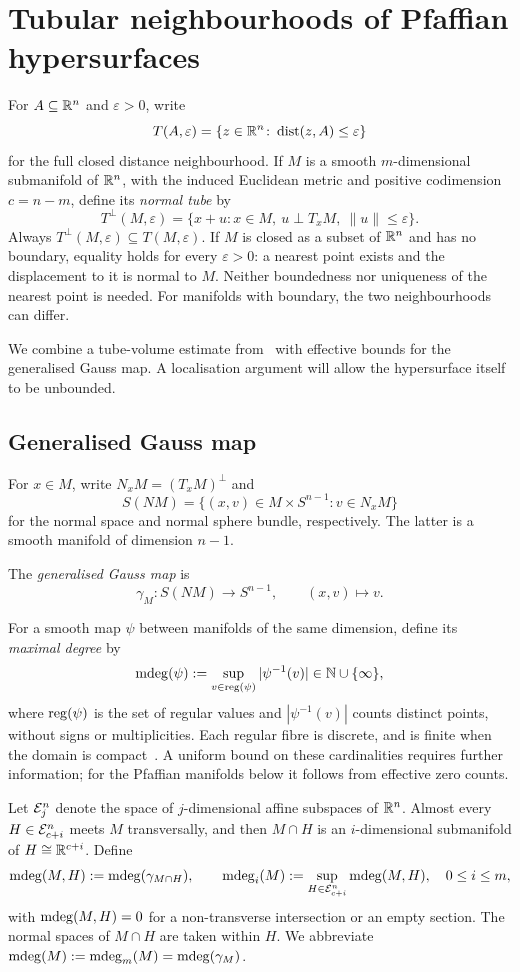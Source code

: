 \section{Tubular neighbourhoods of Pfaffian hypersurfaces}\label{sec:tubular}
For $A\subseteq\mathbb{R}^n$ and $\varepsilon>0$, write
\[
T(A,\varepsilon)=\{z\in\mathbb{R}^n\colon\operatorname{dist}(z,A)\le\varepsilon\}
\]
for the full closed distance neighbourhood. If $M$ is a smooth $m$-dimensional submanifold of $\mathbb{R}^n$, with the induced Euclidean metric and positive codimension $c=n-m$, define its \emph{normal tube} by
\[
T^\perp(M,\varepsilon)
=\{x+u\colon x\in M,\ u\perp T_xM,\ \|u\|\le\varepsilon\}.
\]
Always $T^\perp(M,\varepsilon)\subseteq T(M,\varepsilon)$. If $M$ is closed as a subset of $\mathbb{R}^n$ and has no boundary, equality holds for every $\varepsilon>0$: a nearest point exists and the displacement to it is normal to $M$. Neither boundedness nor uniqueness of the nearest point is needed. For manifolds with boundary, the two neighbourhoods can differ.

We combine a tube-volume estimate from~\cite{lotz2015volume} with effective bounds for the generalised Gauss map. A localisation argument will allow the hypersurface itself to be unbounded.

\subsection{Generalised Gauss map}
For $x\in M$, write $N_xM=(T_xM)^\perp$ and
\[
S(NM)=\{(x,v)\in M\times S^{n-1}\colon v\in N_xM\}
\]
for the normal space and normal sphere bundle, respectively. The latter is a smooth manifold of dimension $n-1$.

\begin{definition}
The \emph{generalised Gauss map} is
\[
\gamma_M\colon S(NM)\longrightarrow S^{n-1},\qquad (x,v)\longmapsto v.
\]
\end{definition}

For a smooth map $\psi$ between manifolds of the same dimension, define its \emph{maximal degree} by
\[
\operatorname{\mathrm{mdeg}}(\psi):=\sup_{v\in\operatorname{\mathrm{reg}}(\psi)}|\psi^{-1}(v)|\in\mathbb{N}\cup\{\infty\},
\]
where $\operatorname{\mathrm{reg}}(\psi)$ is the set of regular values and $|\psi^{-1}(v)|$ counts distinct points, without signs or multiplicities. Each regular fibre is discrete, and is finite when the domain is compact~\cite[\S 1]{milnor1997topology}. A uniform bound on these cardinalities requires further information; for the Pfaffian manifolds below it follows from effective zero counts.

Let $\mathcal{E}_j^n$ denote the space of $j$-dimensional affine subspaces of $\mathbb{R}^n$. Almost every $H\in\mathcal{E}_{c+i}^n$ meets $M$ transversally, and then $M\cap H$ is an $i$-dimensional submanifold of $H\cong\mathbb{R}^{c+i}$. Define
\[
\operatorname{\mathrm{mdeg}}(M,H):=\operatorname{\mathrm{mdeg}}(\gamma_{M\cap H}),
\qquad
\operatorname{\mathrm{mdeg}}_i(M):=\sup_{H\in\mathcal{E}_{c+i}^n}\operatorname{\mathrm{mdeg}}(M,H),
\quad 0\le i\le m,
\]
with $\operatorname{\mathrm{mdeg}}(M,H)=0$ for a non-transverse intersection or an empty section. The normal spaces of $M\cap H$ are taken within $H$. We abbreviate $\operatorname{\mathrm{mdeg}}(M):=\operatorname{\mathrm{mdeg}}_m(M)=\operatorname{\mathrm{mdeg}}(\gamma_M)$.

